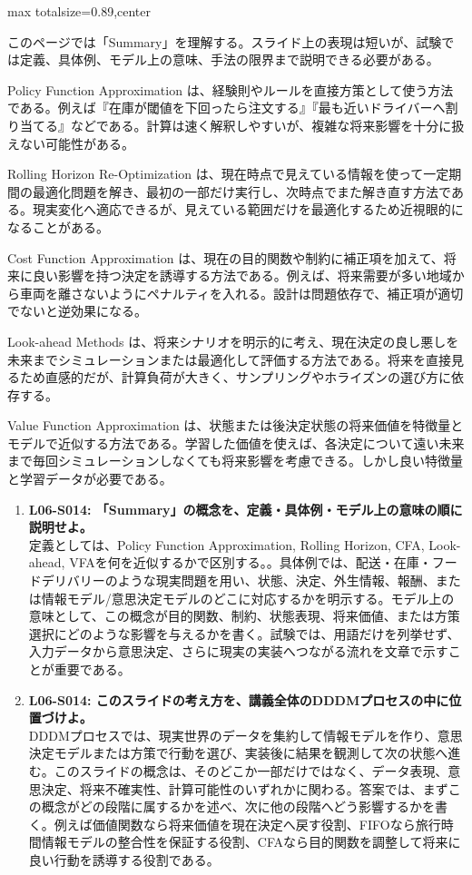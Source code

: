 \begin{minipage}[t]{0.58\textwidth}
\begin{adjustbox}{max totalsize={\textwidth}{0.89\textheight},center}
\begin{minipage}{\textwidth}\scriptsize
{}このページでは「Summary」を理解する。スライド上の表現は短いが、試験では定義、具体例、モデル上の意味、手法の限界まで説明できる必要がある。\par
Policy Function Approximation は、経験則やルールを直接方策として使う方法である。例えば『在庫が閾値を下回ったら注文する』『最も近いドライバーへ割り当てる』などである。計算は速く解釈しやすいが、複雑な将来影響を十分に扱えない可能性がある。\par
Rolling Horizon Re-Optimization は、現在時点で見えている情報を使って一定期間の最適化問題を解き、最初の一部だけ実行し、次時点でまた解き直す方法である。現実変化へ適応できるが、見えている範囲だけを最適化するため近視眼的になることがある。\par
Cost Function Approximation は、現在の目的関数や制約に補正項を加えて、将来に良い影響を持つ決定を誘導する方法である。例えば、将来需要が多い地域から車両を離さないようにペナルティを入れる。設計は問題依存で、補正項が適切でないと逆効果になる。\par
Look-ahead Methods は、将来シナリオを明示的に考え、現在決定の良し悪しを未来までシミュレーションまたは最適化して評価する方法である。将来を直接見るため直感的だが、計算負荷が大きく、サンプリングやホライズンの選び方に依存する。\par
Value Function Approximation は、状態または後決定状態の将来価値を特徴量とモデルで近似する方法である。学習した価値を使えば、各決定について遠い未来まで毎回シミュレーションしなくても将来影響を考慮できる。しかし良い特徴量と学習データが必要である。\par{}\begin{enumerate}\item \textbf{L06-S014: 「Summary」の概念を、定義・具体例・モデル上の意味の順に説明せよ。}\\定義としては、Policy Function Approximation, Rolling Horizon, CFA, Look-ahead, VFAを何を近似するかで区別する。。具体例では、配送・在庫・フードデリバリーのような現実問題を用い、状態、決定、外生情報、報酬、または情報モデル/意思決定モデルのどこに対応するかを明示する。モデル上の意味として、この概念が目的関数、制約、状態表現、将来価値、または方策選択にどのような影響を与えるかを書く。試験では、用語だけを列挙せず、入力データから意思決定、さらに現実の実装へつながる流れを文章で示すことが重要である。\item \textbf{L06-S014: このスライドの考え方を、講義全体のDDDMプロセスの中に位置づけよ。}\\DDDMプロセスでは、現実世界のデータを集約して情報モデルを作り、意思決定モデルまたは方策で行動を選び、実装後に結果を観測して次の状態へ進む。このスライドの概念は、そのどこか一部だけではなく、データ表現、意思決定、将来不確実性、計算可能性のいずれかに関わる。答案では、まずこの概念がどの段階に属するかを述べ、次に他の段階へどう影響するかを書く。例えば価値関数なら将来価値を現在決定へ戻す役割、FIFOなら旅行時間情報モデルの整合性を保証する役割、CFAなら目的関数を調整して将来に良い行動を誘導する役割である。\end{enumerate}

\end{minipage}
\end{adjustbox}
\end{minipage}
